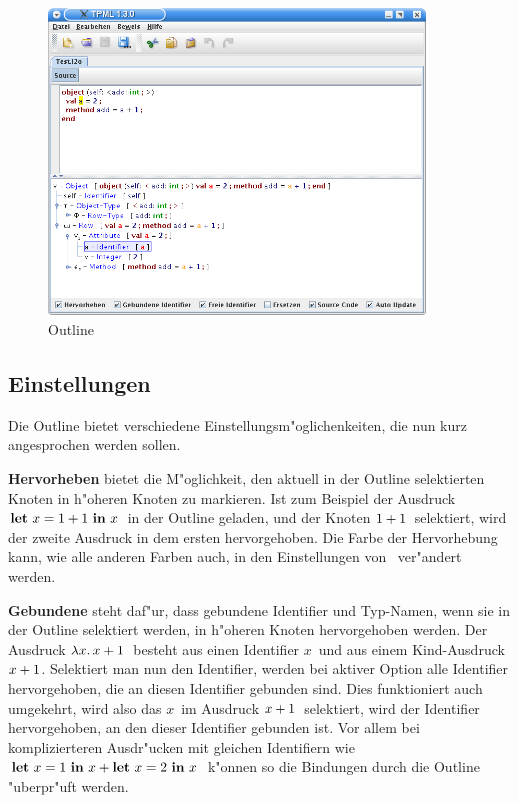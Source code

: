 \begin{figure}[h]
\begin{center}
\includegraphics[width=10cm]{images/outline.png}
\caption{Outline}
\end{center}
\end{figure}

\subsection {Einstellungen}
Die Outline bietet verschiedene Einstellungsm"oglichenkeiten, die nun
kurz angesprochen werden sollen.

{\bf Hervorheben} bietet die M"oglichkeit, den aktuell in der Outline
selektierten Knoten in h"oheren Knoten zu markieren. Ist zum Beispiel
der Ausdruck \glqq$\bli{x}{\infix{+}{1}{1}}{x}$\grqq\ in der Outline geladen,
und der Knoten \glqq${\infix{+}{1}{1}}$\grqq\ selektiert, wird der zweite Ausdruck
in dem ersten hervorgehoben. Die Farbe der Hervorhebung kann, wie alle
anderen Farben auch, in den Einstellungen von \TPML\ ver"andert werden.

{\bf Gebundene} steht daf"ur, dass gebundene Identifier und Typ-Namen,
wenn sie in der Outline selektiert werden, in h"oheren Knoten 
hervorgehoben werden. Der Ausdruck \glqq$\abstr{x}{\infix{+}{x}{1}}$\grqq\ besteht
aus einen Identifier \glqq$x$\grqq\ und aus einem Kind-Ausdruck
\glqq$\infix{+}{x}{1}$\grqq. Selektiert man nun den Identifier, werden bei
aktiver Option alle Identifier hervorgehoben, die an diesen Identifier
gebunden sind. Dies funktioniert auch umgekehrt, wird also das
\glqq$x$\grqq\ im Ausdruck \glqq$\infix{+}{x}{1}$\grqq\ selektiert, wird der
Identifier hervorgehoben, an den dieser Identifier gebunden ist. Vor allem
bei komplizierteren Ausdr"ucken mit gleichen Identifiern wie 
\glqq$\bli{x}{1}{\infix{+}{x}{\bli{x}{2}{x}}}$\grqq\ k"onnen so die Bindungen
durch die Outline "uberpr"uft werden.

